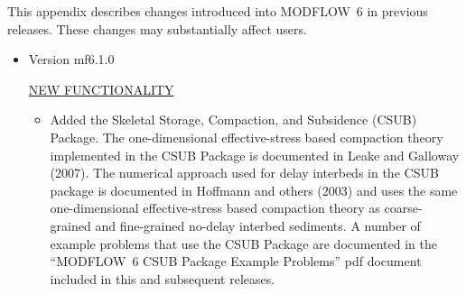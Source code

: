 This appendix describes changes introduced into MODFLOW~6 in previous releases. These changes may substantially affect users.

\begin{itemize}
	\item Version mf6.1.0
	
	\underline{NEW FUNCTIONALITY}
	\begin{itemize}
		\item Added the Skeletal Storage, Compaction, and Subsidence (CSUB) Package. The one-dimensional effective-stress based compaction theory implemented in the CSUB Package is documented in Leake and Galloway (2007). The numerical approach used for delay interbeds in the CSUB package is documented in Hoffmann and others (2003) and uses the same one-dimensional effective-stress based compaction theory as coarse-grained and fine-grained no-delay interbed sediments. A number of example problems that use the CSUB Package are documented in the ``MODFLOW~6 CSUB Package Example Problems'' pdf document included in this and subsequent releases.
	\end{itemize}
	

\end{itemize}
